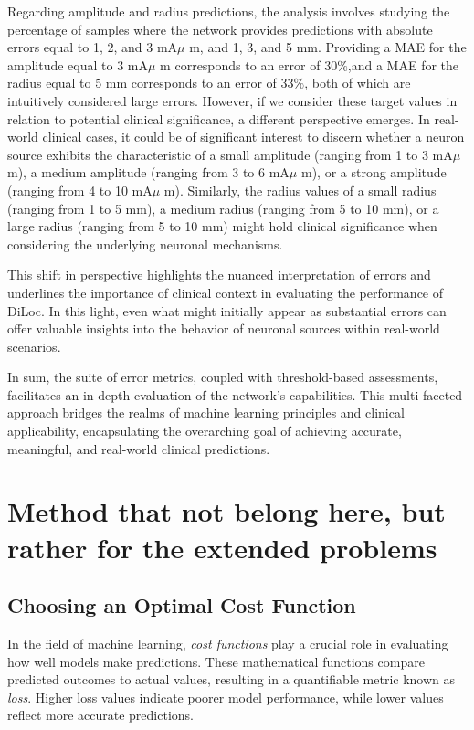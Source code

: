 \documentclass[a4paper, UKenglish, 11pt]{uiomaster}
\begin{document}
Regarding amplitude and radius predictions, the analysis involves studying the percentage of samples where the network provides predictions with absolute errors equal to 1, 2, and 3 mA$\mu$ m, and 1, 3, and 5 mm. Providing a MAE for the amplitude equal to 3 mA$\mu$ m corresponds to an error of 30$\%$,and a MAE for the radius equal to 5 mm corresponds to an error of 33$\%$, both of which are intuitively considered large errors. However, if we consider these target values in relation to potential clinical significance, a different perspective emerges. In real-world clinical cases, it could be of significant interest to discern whether a neuron source exhibits the characteristic of a small amplitude (ranging from 1 to 3 mA$\mu$ m), a medium amplitude (ranging from 3 to 6 mA$\mu$ m), or a strong amplitude (ranging from 4 to 10 mA$\mu$ m). Similarly, the radius values of a small radius (ranging from 1 to 5 mm), a medium radius (ranging from 5 to 10 mm), or a large radius (ranging from 5 to 10 mm) might hold clinical significance when considering the underlying neuronal mechanisms.

This shift in perspective highlights the nuanced interpretation of errors and underlines the importance of clinical context in evaluating the performance of DiLoc. In this light, even what might initially appear as substantial errors can offer valuable insights into the behavior of neuronal sources within real-world scenarios.

In sum, the suite of error metrics, coupled with threshold-based assessments, facilitates an in-depth evaluation of the network's capabilities. This multi-faceted approach bridges the realms of machine learning principles and clinical applicability, encapsulating the overarching goal of achieving accurate, meaningful, and real-world clinical predictions.






\section{Method that not belong here, but rather for the extended problems}

\subsection{Choosing an Optimal Cost Function}
In the field of machine learning, \emph{cost functions} play a crucial role in evaluating how well models make predictions. These mathematical functions compare predicted outcomes to actual values, resulting in a quantifiable metric known as \emph{loss}. Higher loss values indicate poorer model performance, while lower values reflect more accurate predictions.
\end{document}
